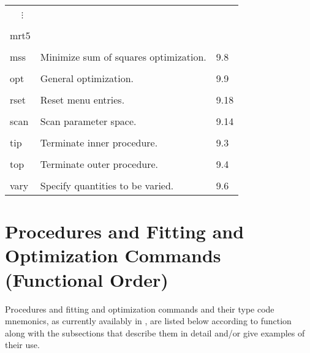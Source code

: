 \begin{center}
\begin{tabular}{lll}
\hspace{1.5em}\ \ \,$\vdots$ & &\\
\vspace{-7mm}& &\\
\hspace{1.5em}mrt5 & &\\
\vspace{-3mm}& &\\
\hspace{1.5em}mss    &  Minimize sum of squares optimization. &  \hspace{2em}9.8\\
\vspace{-3mm}& &\\
\hspace{1.5em}opt    &     General optimization.          &     \hspace{2em}9.9\\
\vspace{-3mm}& &\\
\hspace{1.5em}rset   &     Reset menu entries.              &     \hspace{2em}9.18\\
\vspace{-3mm}& &\\
\hspace{1.5em}scan   &     Scan parameter space.         &      \hspace{2em}9.14\\
\vspace{-3mm}& &\\
\hspace{1.5em}tip    &     Terminate inner procedure.            &       \hspace{2em}9.3\\
\vspace{-3mm}& &\\
\hspace{1.5em}top    &     Terminate outer procedure.              &     \hspace{2em}9.4\\
\vspace{-3mm}& &\\
\hspace{1.5em}vary   &     Specify quantities to be varied.     &        \hspace{2em}9.6
\end{tabular}
\end{center}

\newpage
\section[Procedures and Fitting $\cdots$
(Functional Order)]{Procedures and Fitting and Optimization Commands \protect\newline
(Functional Order)}
     Procedures and fitting and optimization commands and their type code
mnemonics, as currently availably in , are listed below
according to function along with the subsections that describe them in
detail and/or give examples of their use.

